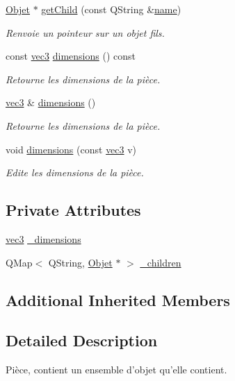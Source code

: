 \begin{DoxyCompactItemize}
\hyperlink{class_objet}{Objet} $\ast$ \hyperlink{class_piece_aa77dc9ed8493cc22d1455c3eb2bec013}{get\+Child} (const Q\+String \&\hyperlink{class_objet_a4a702c189bedcbf1e65da6aec72c8e44}{name})
\begin{DoxyCompactList}\small\item\em Renvoie un pointeur sur un objet fils. \end{DoxyCompactList}\item 
const \hyperlink{structvec3}{vec3} \hyperlink{class_piece_ab522c715b4dd27b0789f5aed218ab59d}{dimensions} () const 
\begin{DoxyCompactList}\small\item\em Retourne les dimensions de la pièce. \end{DoxyCompactList}\item 
\hyperlink{structvec3}{vec3} \& \hyperlink{class_piece_a3f5440ec22866d79a26a513470744412}{dimensions} ()
\begin{DoxyCompactList}\small\item\em Retourne les dimensions de la pièce. \end{DoxyCompactList}\item 
void \hyperlink{class_piece_a4419c3b0a9e57dcd215dd87be025752f}{dimensions} (const \hyperlink{structvec3}{vec3} v)
\begin{DoxyCompactList}\small\item\em Edite les dimensions de la pièce. \end{DoxyCompactList}\end{DoxyCompactItemize}
\subsection*{Private Attributes}
\begin{DoxyCompactItemize}
\item 
\hyperlink{structvec3}{vec3} \hyperlink{class_piece_a47a3458694b894041bd95a1666c9bf3d}{\+\_\+dimensions}
\item 
Q\+Map$<$ Q\+String, \hyperlink{class_objet}{Objet} $\ast$ $>$ \hyperlink{class_piece_ac80078a597e7edcd297895bab25731e6}{\+\_\+children}
\end{DoxyCompactItemize}
\subsection*{Additional Inherited Members}


\subsection{Detailed Description}
Pièce, contient un ensemble d'objet qu'elle contient. 

